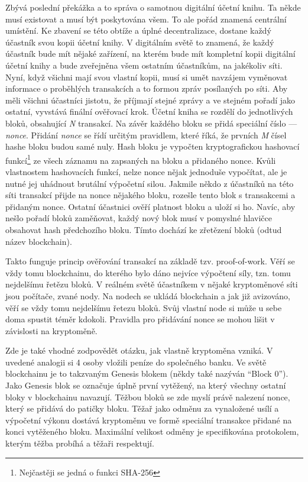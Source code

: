 Zbývá poslední překážka a to správa o samotnou digitální účetní knihu. Ta někde musí existovat a musí být poskytována všem. To ale pořád
znamená centrální umístění. Ke zbavení se této obtíže a úplné decentralizace, dostane každý účastník svou kopii účetní knihy. V digitálním světě
to znamená, že
každý účastník bude mít nějaké zařízení, na kterém bude mít kompletní kopii digitální účetní knihy a bude zveřejněna všem ostatním účastníkům,
na jakékoliv síti. Nyní, když všichni mají svou vlastní kopii, musí si umět navzájem vyměnovat informace o proběhlých transakcích a to formou
zpráv posílaných po síti. Aby měli všichni účastníci jistotu, že příjmají stejné zprávy a ve stejném pořadí jako ostatní, vyvstává finální
ověřovací krok. Účetní kniha se rozdělí do jednotlivých bloků, obsahující \emph{N} transakcí. Na závěr každého bloku se přidá speciální
číslo --- \emph{nonce}. Přidání \emph{nonce} se řídí určitým pravidlem, které říká, že prvních \emph{M} čísel hashe bloku budou samé nuly.
Hash bloku je vypočten kryptografickou hashovací funkcí\footnote{Nejčastěji se jedná o funkci SHA-256} ze všech záznamu na zapsaných na bloku
a přidaného nonce. Kvůli vlastnostem hashovacích funkcí, nelze nonce nějak jednoduše vypočítat, ale je nutné jej uhádnout brutální výpočetní silou.
Jakmile někdo z účastníků na této síti transakcí přijde na nonce nějakého bloku, rozešle tento blok s transakcemi a přidaným nonce.
Ostatní účastnici ověří platnost bloku a uloží si ho. Navíc, aby nešlo pořadí bloků zaměňovat, každý nový blok musí v pomyslné hlavičce
obsahovat hash předchozího bloku. Tímto dochází ke zřetězení bloků (odtud název blockchain).

Takto funguje princip ověřování transakcí na základě tzv. proof-of-work. Věří se vždy tomu blockchainu, do kterého bylo dáno nejvíce
výpočtení síly, tzn. tomu nejdelšímu řetězu bloků. V reálném světě účastníkem v nějaké kryptoměnové síti jsou počítače, zvané nody.
Na nodech se ukládá blockchain a jak již avizováno, věří se vždy tomu nejdelšímu řetezu bloků. Svůj vlastní node si může u sebe doma spustit
téměr kdokoli. Pravidla pro přidávání nonce se mohou lišit v závislosti na kryptoměně.

Zde je také vhodné zodpovědět otázku, jak vlastně kryptoměna vzniká. V uvedené analogii si 4 osoby vložili peníze do společného banku.
Ve světě blockchainu je to takzvaným Genesis blokem (někdy také nazýván \enquote{Block 0}). Jako Genesis blok se označuje úplně první
vytěžený, na který všechny ostatní bloky v blockchainu navazují. Těžbou bloků se zde myslí právě nalezení nonce, který se přidává do patičky
bloku. Těžař jako odměnu za vynaložené usílí a výpočetní výkonu dostává kryptoměnu ve formě speciální transakce přidané na konci vytěženého bloku.
Maximální velikost odměny je specifikována protokolem, kterým těžba probíhá a těžaři respektují.

